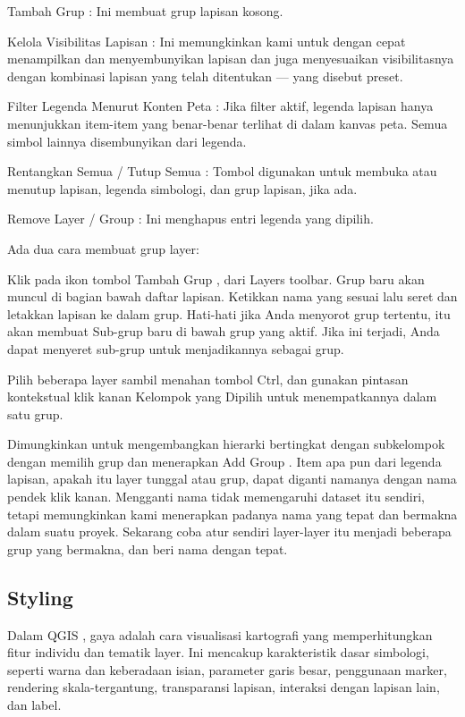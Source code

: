 \documentclass[]{book}
\begin{document}
Tambah Grup : Ini membuat grup lapisan kosong.

Kelola Visibilitas Lapisan : Ini memungkinkan kami untuk dengan cepat menampilkan dan menyembunyikan lapisan dan juga menyesuaikan visibilitasnya dengan kombinasi lapisan yang telah ditentukan --- yang disebut preset.

Filter Legenda Menurut Konten Peta : Jika filter aktif, legenda lapisan hanya menunjukkan item-item yang benar-benar terlihat di dalam kanvas peta. Semua simbol lainnya disembunyikan dari legenda.

Rentangkan Semua / Tutup Semua : Tombol digunakan untuk membuka atau menutup lapisan, legenda simbologi, dan grup lapisan, jika ada.

Remove Layer / Group : Ini menghapus entri legenda yang dipilih.

Ada dua cara membuat grup layer:

Klik pada ikon tombol Tambah Grup , dari Layers toolbar. Grup baru akan muncul di bagian bawah daftar lapisan. Ketikkan nama yang sesuai lalu seret dan letakkan lapisan ke dalam grup. Hati-hati jika Anda menyorot grup tertentu, itu akan membuat Sub-grup baru di bawah grup yang aktif. Jika ini terjadi, Anda dapat menyeret sub-grup untuk menjadikannya sebagai grup.

Pilih beberapa layer sambil menahan tombol Ctrl, dan gunakan pintasan kontekstual klik kanan Kelompok yang Dipilih untuk menempatkannya dalam satu grup.

Dimungkinkan untuk mengembangkan hierarki bertingkat dengan subkelompok dengan memilih grup dan menerapkan Add Group . Item apa pun dari legenda lapisan, apakah itu layer tunggal atau grup, dapat diganti namanya dengan nama pendek klik kanan. Mengganti nama tidak memengaruhi dataset itu sendiri, tetapi memungkinkan kami menerapkan padanya nama yang tepat dan bermakna dalam suatu proyek. Sekarang coba atur sendiri layer-layer itu menjadi beberapa grup yang bermakna, dan beri nama dengan tepat.

\hypertarget{styling}{%
\subsection{Styling}\label{styling}}

Dalam QGIS , gaya adalah cara visualisasi kartografi yang memperhitungkan fitur individu dan tematik layer. Ini mencakup karakteristik dasar simbologi, seperti warna dan keberadaan isian, parameter garis besar, penggunaan marker, rendering skala-tergantung, transparansi lapisan, interaksi dengan lapisan lain, dan label.
\end{document}
